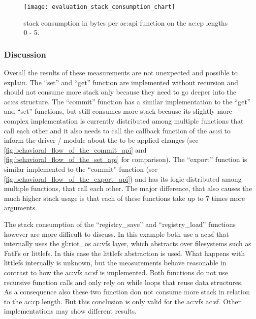 \begin{figure}[H]
    \centering
    \texttt{[image: evaluation\_stack\_consumption\_chart]}
    \caption{ stack consumption in bytes per \gls{ac:api} function on the \gls{ac:cp} lengths 0 - 5.}
    \label{fig:evaluation:stack_overhead_chart}
\end{figure}

\subsubsection{Discussion}

Overall the results of these measurements are not unexpected and possible to explain.
The ``set'' and ``get'' function are implemented without recursion and should not consume more stack only because they need to go deeper into the \gls{ac:cs} structure.
The ``commit'' function has a similar implementation to the ``get'' and ``set'' functions, but still consumes more stack because its slightly more complex implementation is currently distributed among multiple functions that call each other and it also needs to call the callback function of the \gls{ac:si} to inform the driver / module about the to be applied changes (see \autoref{fig:behavioral_flow_of_the_commit_api} and \autoref{fig:behavioral_flow_of_the_set_api} for comparison).
The ``export'' function is similar implemented to the ``commit'' function (see \autoref{fig:behavioral_flow_of_the_export_api}) and has its logic distributed among multiple functions, that call each other.
The major difference, that also causes the much higher stack usage is that each of these functions take up to 7 times more arguments.

The stack consumption of the ``registry\_save'' and ``registry\_load'' functions however  are more difficult to discuss.
In this example both use a \gls{ac:sf} that internally uses the \gls{gl:riot_os} \gls{ac:vfs} layer, which abstracts over filesystems such as FatFs or littlefs.
In this case the littlefs abstraction is used.
What happens with littlefs internally is unknown, but the measurements behave reasonable in contrast to how the \gls{ac:vfs} \gls{ac:sf} is implemented.
Both functions do not use recursive function calls and only rely on while loops that reuse data structures.
As a consequence also these two function don not consume more stack in relation to the \gls{ac:cp} length.
But this conclusion is only valid for the \gls{ac:vfs} \gls{ac:sf}.
Other implementations may show different results.

